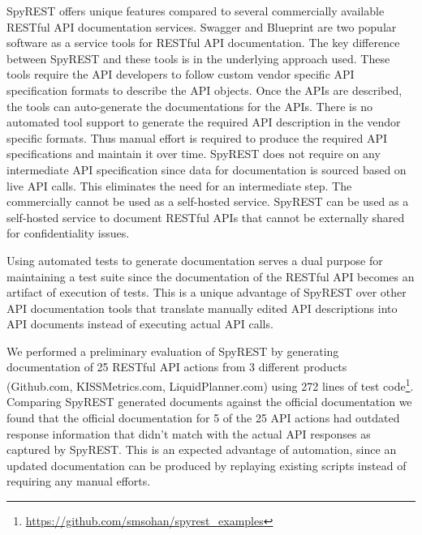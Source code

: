 \documentclass[conference]{IEEEtran}
\begin{document}
SpyREST offers unique features compared to several commercially available RESTful API documentation services. Swagger and Blueprint are two popular software as a service tools for RESTful API documentation. The key difference between SpyREST and these tools is in the underlying approach used. These tools require the API developers to follow custom vendor specific API specification formats to describe the API objects. Once the APIs are described, the tools can auto-generate the documentations for the APIs. There is no automated tool support to generate the required API description in the vendor specific formats. Thus manual effort is required to produce the required API specifications and maintain it over time. SpyREST does not require on any intermediate API specification since data for documentation is sourced based on live API calls. This eliminates the need for an intermediate step. The commercially cannot be used as a self-hosted service. SpyREST can be used as a self-hosted service to document RESTful APIs that cannot be externally shared for confidentiality issues.

Using automated tests to generate documentation serves a dual purpose for maintaining a test suite since the documentation of the RESTful API becomes an artifact of execution of tests. This is a unique advantage of SpyREST over other API documentation tools that translate manually edited API descriptions into API documents instead of executing actual API calls.

We performed a preliminary evaluation of SpyREST by generating documentation of 25 RESTful API actions from 3 different products (Github.com, KISSMetrics.com, LiquidPlanner.com) using 272 lines of test code\footnote{\url{https://github.com/smsohan/spyrest_examples}}. Comparing SpyREST generated documents against the official documentation we found that the official documentation for 5 of the 25 API actions had outdated response information that didn't match with the actual API responses as captured by SpyREST. This is an expected advantage of automation, since an updated documentation can be produced by replaying existing scripts instead of requiring any manual efforts.
\end{document}
